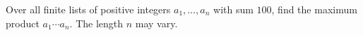 Over all finite lists of positive integers $a_1,\ldots,a_n$ with sum $100$, find the maximum product $a_1\cdots a_n$. The length $n$ may vary.
